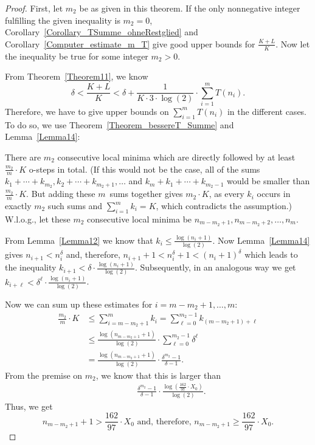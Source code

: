 \documentclass[12pt,reqno]{article}
\begin{document}
\begin{proof}
First, let $m_2$ be as given in this theorem. If the only nonnegative integer fulfilling the given inequality is $m_2=0$, Corollary~\ref{Corollary_TSumme_ohneRestglied} and Corollary~\ref{Computer_estimate_m_T} give good upper bounds for $\tfrac{K+L}{K}$. Now let the inequality be true for some integer $m_2>0$.

From Theorem~\ref{Theorem11}, we know
\[\delta<\frac{K+L}{K}<\delta+\frac{1}{K \cdot 3\cdot \log(2)} \cdot \sum_{i=1}^m T(n_i).\]
Therefore, we have to give upper bounds on $\sum_{i=1}^m T(n_i)$ in the different cases. To do so, we use Theorem~\ref{Theorem_bessereT_Summe} and Lemma~\ref{Lemma14}:

There are $m_2$ consecutive local minima which are directly followed by at least $\frac{m_2}{m} \cdot K$ o-steps in total. (If this would not be the case, all of the sums $k_1+\cdots+k_{m_2}, k_2+\cdots+k_{m_2+1}, \ldots$ and $k_{m}+k_1+\cdots+k_{m_2-1}$ would be smaller than $\tfrac{m_2}{m} \cdot K$. But adding these $m$~sums together gives $m_2 \cdot K$, as every $k_i$ occurs in exactly $m_2$ such sums and $\sum_{i=1}^{m} k_i=K$, which contradicts the assumption.) W.l.o.g., let these $m_2$ consecutive local minima be $n_{m-m_2+1}, n_{m-m_2+2}, \ldots, n_m$.

From Lemma~\ref{Lemma12} we know that $k_i\leq \tfrac{\log(n_i+1)}{\log(2)}$. Now Lemma~\ref{Lemma14} gives $n_{i+1}<n_i^{\delta}$ and, therefore, $n_{i+1}+1<n_i^{\delta}+1<(n_i+1)^{\delta}$ which leads to the 
inequality $k_{i+1}<\delta \cdot \tfrac{\log(n_i+1)}{\log(2)}$. Subsequently, in an analogous way we get $k_{i+\ell} < \delta^{\ell} \cdot \tfrac{\log(n_i+1)}{\log(2)}$.

Now we can sum up these estimates for $i=m-m_2+1, \ldots, m$:
\begin{align*}
\frac{m_2}{m} \cdot K &\leq  \sum_{i=m-m_2+1}^{m} k_i = \sum_{\ell=0}^{m_2-1} k_{(m-m_2+1)+\ell}\\
\quad &\leq \frac{\log(n_{m-m_2+1}+1)}{\log(2)} \cdot \sum_{\ell=0}^{m_2-1} \delta^{\ell}\\
\quad &= \frac{\log(n_{m-m_2+1}+1)}{\log(2)} \cdot \frac{\delta^{m_2}-1}{\delta-1}.
\end{align*}
From the premise on $m_2$, we know that this is larger than 
\begin{align*}
\quad &\phantom{=} \frac{\delta^{m_2}-1}{\delta-1} \cdot \frac{\log\left(\frac{162}{97} \cdot X_0\right)}{\log(2)}.
\end{align*}
Thus, we get
\[n_{m-m_2+1}+1 > \frac{162}{97} \cdot X_0 \text{ and, therefore, } n_{m-m_2+1}\geq \frac{162}{97} \cdot X_0.\]


\end{proof}
\end{document}
